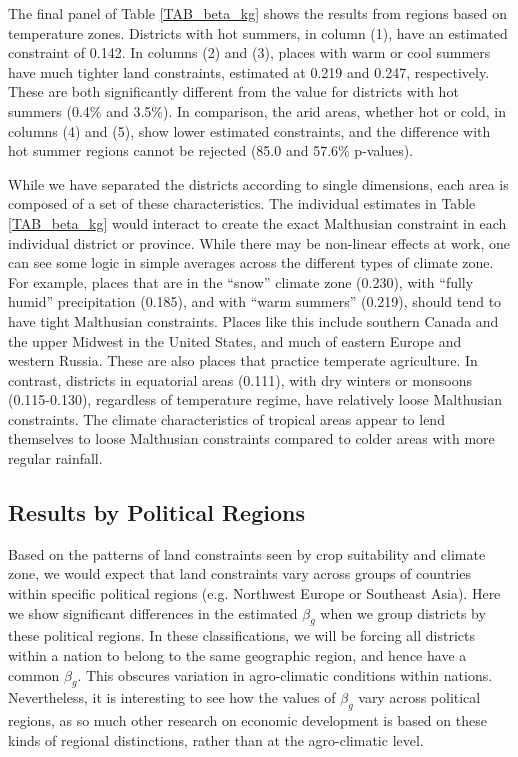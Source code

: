 \documentclass[11pt]{article}
\begin{document}
The final panel of Table \ref{TAB_beta_kg} shows the results from regions based on temperature zones. Districts with hot summers, in column (1), have an estimated constraint of 0.142. In columns (2) and (3), places with warm or cool summers have much tighter land constraints, estimated at 0.219 and 0.247, respectively. These are both significantly different from the value for districts with hot summers (0.4\% and 3.5\%). In comparison, the arid areas, whether hot or cold, in columns (4) and (5), show lower estimated constraints, and the difference with hot summer regions cannot be rejected (85.0 and 57.6\% p-values).

While we have separated the districts according to single dimensions, each area is composed of a set of these characteristics. The individual estimates in Table \ref{TAB_beta_kg} would interact to create the exact Malthusian constraint in each individual district or province. While there may be non-linear effects at work, one can see some logic in simple averages across the different types of climate zone. For example, places that are in the ``snow'' climate zone (0.230), with ``fully humid'' precipitation (0.185), and with ``warm summers'' (0.219), should tend to have tight Malthusian constraints. Places like this include southern Canada and the upper Midwest in the United States, and much of eastern Europe and western Russia. These are also places that practice temperate agriculture. In contrast, districts in equatorial areas (0.111), with dry winters or monsoons (0.115-0.130), regardless of temperature regime, have relatively loose Malthusian constraints. The climate characteristics of tropical areas appear to lend themselves to loose Malthusian constraints compared to colder areas with more regular rainfall. 

\subsection{Results by Political Regions}
Based on the patterns of land constraints seen by crop suitability and climate zone, we would expect that land constraints vary across groups of countries within specific political regions (e.g. Northwest Europe or Southeast Asia). Here we show significant differences in the estimated $\beta_g$ when we group districts by these political regions. In these classifications, we will be forcing all districts within a nation to belong to the same geographic region, and hence have a common $\beta_g$. This obscures variation in agro-climatic conditions within nations. Nevertheless, it is interesting to see how the values of $\beta_g$ vary across political regions, as so much other research on economic development is based on these kinds of regional distinctions, rather than at the agro-climatic level.
\end{document}
